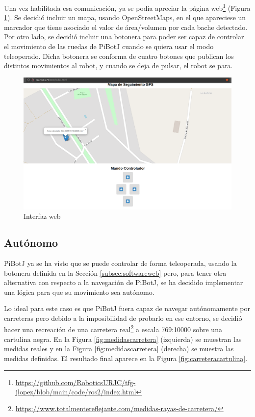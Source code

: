 Una vez habilitada esa comunicación, ya se podía apreciar la página web\footnote{\url{https://github.com/RoboticsURJC/tfg-jlopez/blob/main/code/ros2/index.html}} (Figura \ref{fig:interfazweb}). Se decidió incluir un mapa, usando OpenStreetMaps, en el que apareciese un marcador que tiene asociado el valor de área/volumen por cada bache detectado. Por otro lado, se decidió incluir una botonera para poder ser capaz de controlar el movimiento de las ruedas de PiBotJ cuando se quiera usar el modo teleoperado. Dicha botonera se conforma de cuatro botones que publican los distintos movimientos al robot, y cuando se deja de pulsar, el robot se para.


\begin{figure} [h!]
	\begin{center}
		\includegraphics[width=15cm]{figs/cap6/interfazweb.png}
	\end{center}
	\caption{Interfaz web}
	\label{fig:interfazweb}
\end{figure}


\subsection{Autónomo}
\label{subsec:autonomo}
PiBotJ ya se ha visto que se puede controlar de forma teleoperada, usando la botonera definida en la Sección \ref{subsec:softwareweb} pero, para tener otra alternativa con respecto a la navegación de PiBotJ, se ha decidido implementar una lógica para que su movimiento sea autónomo. 

Lo ideal para este caso es que PiBotJ fuera capaz de navegar  autónomamente por carreteras pero debido a la imposibilidad de probarlo en ese entorno, se decidió hacer una recreación de una carretera real\footnote{\url{https://www.totalmentereflejante.com/medidas-rayas-de-carretera/}} a escala 769:10000 sobre una cartulina negra. En la Figura \ref{fig:medidascarretera} (izquierda) se muestran las medidas reales y en la Figura \ref{fig:medidascarretera} (derecha) se muestra las medidas definidas. El resultado final aparece en la Figura \ref{fig:carreteracartulina}.

